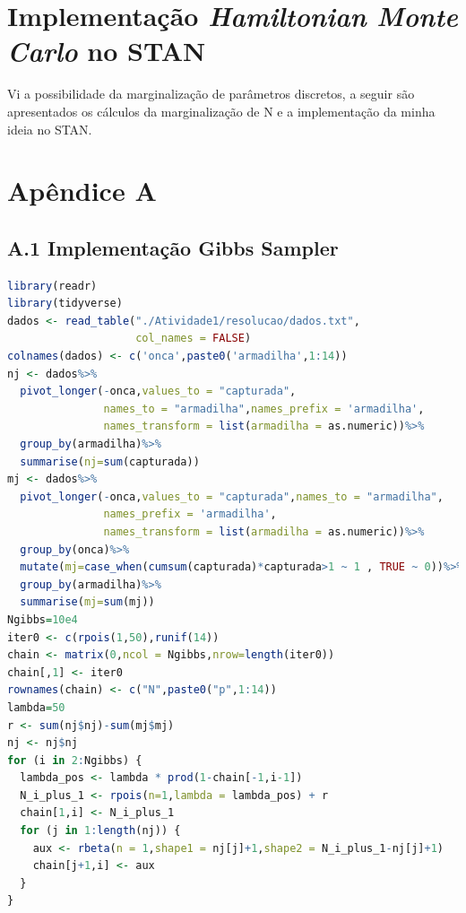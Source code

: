 \documentclass[a4paper,12pt,twoside]{article}
\begin{document}
\newpage
\section{Implementação \textit{Hamiltonian Monte Carlo} no STAN}
Vi a possibilidade da marginalização de parâmetros discretos, a seguir são apresentados os cálculos da marginalização de N e a implementação da minha ideia no STAN.
\newpage
\section*{Apêndice A}
\subsection*{A.1 Implementação Gibbs Sampler}
\begin{lstlisting}[language=R]
library(readr)
library(tidyverse)
dados <- read_table("./Atividade1/resolucao/dados.txt", 
                    col_names = FALSE)
colnames(dados) <- c('onca',paste0('armadilha',1:14))
nj <- dados%>%
  pivot_longer(-onca,values_to = "capturada",
               names_to = "armadilha",names_prefix = 'armadilha',
               names_transform = list(armadilha = as.numeric))%>%
  group_by(armadilha)%>%
  summarise(nj=sum(capturada))
mj <- dados%>%
  pivot_longer(-onca,values_to = "capturada",names_to = "armadilha",
               names_prefix = 'armadilha',
               names_transform = list(armadilha = as.numeric))%>%
  group_by(onca)%>%
  mutate(mj=case_when(cumsum(capturada)*capturada>1 ~ 1 , TRUE ~ 0))%>%
  group_by(armadilha)%>%
  summarise(mj=sum(mj))
Ngibbs=10e4
iter0 <- c(rpois(1,50),runif(14))
chain <- matrix(0,ncol = Ngibbs,nrow=length(iter0))
chain[,1] <- iter0
rownames(chain) <- c("N",paste0("p",1:14))
lambda=50
r <- sum(nj$nj)-sum(mj$mj)
nj <- nj$nj 
for (i in 2:Ngibbs) {
  lambda_pos <- lambda * prod(1-chain[-1,i-1])
  N_i_plus_1 <- rpois(n=1,lambda = lambda_pos) + r
  chain[1,i] <- N_i_plus_1 
  for (j in 1:length(nj)) {
    aux <- rbeta(n = 1,shape1 = nj[j]+1,shape2 = N_i_plus_1-nj[j]+1)
    chain[j+1,i] <- aux
  }
}
\end{lstlisting}
\end{document}
